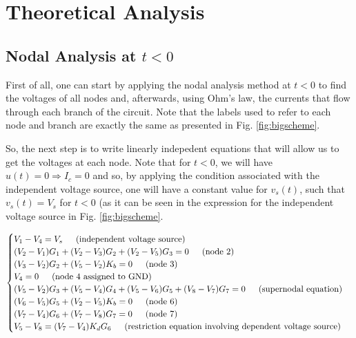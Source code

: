 \section{Theoretical Analysis}
\label{sec:theo}
\subsection{Nodal Analysis at $t<0$}
\label{sec:1st}
First of all, one can start by applying the nodal analysis method at $t<0$ to find the voltages of all nodes and, afterwards, using Ohm's law, the currents that flow through each branch of the circuit. Note that the labels used to refer to each node and branch are exactly the same as presented in Fig. \ref{fig:bigscheme}.

So, the next step is to write linearly indepedent equations that will allow us to get the voltages at each node. Note that for $t<0$, we will have $u(t) = 0 \Longrightarrow I_c = 0$ and so, by applying the condition associated with the independent voltage source, one will have a constant value for $v_s(t)$, such that $v_s (t) = V_s$ for $t<0$ (as it can be seen in the expression for the independent voltage source in Fig. \ref{fig:bigscheme}.

\begin{equation}
    \begin{cases}
        V_1 - V_4 = V_s \hspace{15px} \text{(independent voltage source)}\\
        (V_2-V_1)G_1 + (V_2-V_3)G_2 + (V_2-V_5)G_3 = 0 \hspace{15px}\text{(node 2)}\\
        (V_3 - V_2)G_2 + (V_5 - V_2)K_b = 0 \hspace{15px}\text{(node 3)}\\ 
        V_4 = 0 \hspace{15px}\text{(node 4 assigned to GND)}\\
        (V_5-V_2)G_3 + (V_5-V_4)G_4 + (V_5-V_6)G_5 + (V_8-V_7)G_7 = 0 \hspace{15px}\text{(supernodal equation)}\\
        (V_6-V_5)G_5 + (V_2-V_5)K_b = 0 \hspace{15px}\text{(node 6)}\\
        (V_7-V_4)G_6 + (V_7-V_8)G_7 = 0 \hspace{15px}\text{(node 7)}\\
        V_5 - V_8 = (V_7-V_4)K_dG_6 \hspace{15px}\text{(restriction equation involving dependent voltage source)}
    \end{cases}
\end{equation}

